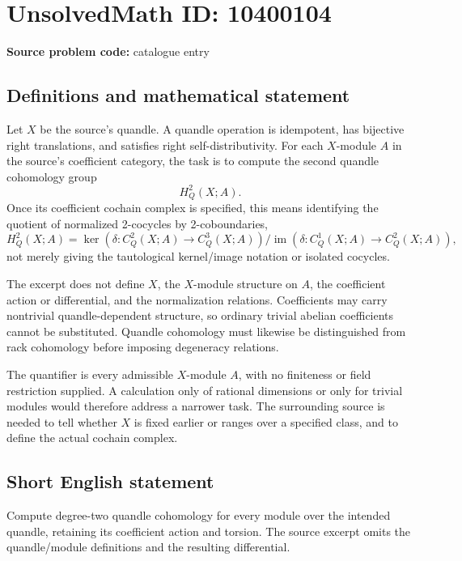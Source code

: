 \documentclass[11pt]{article}
\begin{document}
\section*{UnsolvedMath ID: 10400104}
\textbf{Source problem code:} catalogue entry
\subsection{Definitions and mathematical statement}
Let \(X\) be the source's quandle. A quandle operation is idempotent, has bijective right translations, and satisfies right self-distributivity. For each \(X\)-module \(A\) in the source's coefficient category, the task is to compute the second quandle cohomology group
\[
 H_Q^2(X;A).
\]
Once its coefficient cochain complex is specified, this means identifying the quotient of normalized 2-cocycles by 2-coboundaries,
\[
 H_Q^2(X;A)=\ker(\delta:C_Q^2(X;A)\to C_Q^3(X;A))\big/
 \operatorname{im}(\delta:C_Q^1(X;A)\to C_Q^2(X;A)),
\]
not merely giving the tautological kernel/image notation or isolated cocycles.

The excerpt does not define \(X\), the \(X\)-module structure on \(A\), the coefficient action or differential, and the normalization relations. Coefficients may carry nontrivial quandle-dependent structure, so ordinary trivial abelian coefficients cannot be substituted. Quandle cohomology must likewise be distinguished from rack cohomology before imposing degeneracy relations.

The quantifier is every admissible \(X\)-module \(A\), with no finiteness or field restriction supplied. A calculation only of rational dimensions or only for trivial modules would therefore address a narrower task. The surrounding source is needed to tell whether \(X\) is fixed earlier or ranges over a specified class, and to define the actual cochain complex.
\subsection{Short English statement}
Compute degree-two quandle cohomology for every module over the intended quandle, retaining its coefficient action and torsion. The source excerpt omits the quandle/module definitions and the resulting differential.
\end{document}
